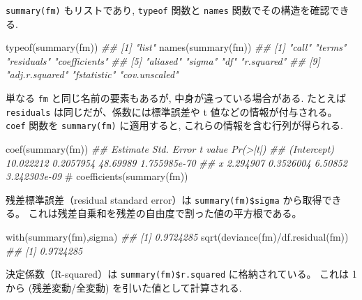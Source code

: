 \documentclass[
  letterpaper,
  xelatex,
  ja=standard, xelatex]{bxjsbook}
\newenvironment{Shaded}{\begin{snugshade}}{\end{snugshade}}
\newcommand{\CommentTok}[1]{\textcolor[rgb]{0.37,0.37,0.37}{#1}}
\newcommand{\DocumentationTok}[1]{\textcolor[rgb]{0.37,0.37,0.37}{\textit{#1}}}
\newcommand{\FunctionTok}[1]{\textcolor[rgb]{0.28,0.35,0.67}{#1}}
\newcommand{\NormalTok}[1]{\textcolor[rgb]{0.00,0.23,0.31}{#1}}
\newcommand{\SpecialCharTok}[1]{\textcolor[rgb]{0.37,0.37,0.37}{#1}}
\begin{document}
\texttt{summary(fm)} もリストであり, \texttt{typeof} 関数と
\texttt{names} 関数でその構造を確認できる.

\begin{Shaded}
\begin{Highlighting}[]
\FunctionTok{typeof}\NormalTok{(}\FunctionTok{summary}\NormalTok{(fm))}
\DocumentationTok{\#\# [1] "list"}
\FunctionTok{names}\NormalTok{(}\FunctionTok{summary}\NormalTok{(fm))}
\DocumentationTok{\#\#  [1] "call"          "terms"         "residuals"     "coefficients" }
\DocumentationTok{\#\#  [5] "aliased"       "sigma"         "df"            "r.squared"    }
\DocumentationTok{\#\#  [9] "adj.r.squared" "fstatistic"    "cov.unscaled"}
\end{Highlighting}
\end{Shaded}

単なる \texttt{fm} と同じ名前の要素もあるが, 中身が違っている場合がある.
たとえば \texttt{residuals} は同じだが、係数には標準誤差や t
値などの情報が付与される。 \texttt{coef} 関数を \texttt{summary(fm)}
に適用すると, これらの情報を含む行列が得られる.

\begin{Shaded}
\begin{Highlighting}[]
\FunctionTok{coef}\NormalTok{(}\FunctionTok{summary}\NormalTok{(fm))}
\DocumentationTok{\#\#              Estimate Std. Error  t value     Pr(\textgreater{}|t|)}
\DocumentationTok{\#\# (Intercept) 10.022212  0.2057954 48.69989 1.755985e{-}70}
\DocumentationTok{\#\# x            2.294907  0.3526004  6.50852 3.242303e{-}09}
\CommentTok{\# coefficients(summary(fm))}
\end{Highlighting}
\end{Shaded}

残差標準誤差（residual standard error）は \texttt{summary(fm)\$sigma}
から取得できる。
これは残差自乗和を残差の自由度で割った値の平方根である。

\begin{Shaded}
\begin{Highlighting}[]
\FunctionTok{with}\NormalTok{(}\FunctionTok{summary}\NormalTok{(fm),sigma)}
\DocumentationTok{\#\# [1] 0.9724285}
\FunctionTok{sqrt}\NormalTok{(}\FunctionTok{deviance}\NormalTok{(fm)}\SpecialCharTok{/}\FunctionTok{df.residual}\NormalTok{(fm))}
\DocumentationTok{\#\# [1] 0.9724285}
\end{Highlighting}
\end{Shaded}

決定係数（R-squared）は \texttt{summary(fm)\$r.squared}
に格納されている。 これは 1 から (残差変動/全変動)
を引いた値として計算される.
\end{document}
